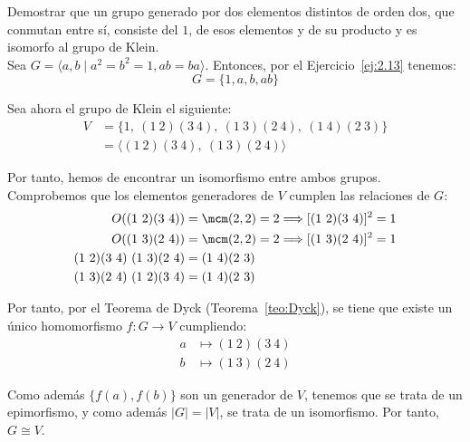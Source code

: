 \begin{ejercicio}\label{ej:2.32}
    Demostrar que un grupo generado por dos elementos distintos de orden dos, que conmutan entre sí, consiste del $1$, de esos elementos y de su producto y es isomorfo al grupo de Klein.\\

    Sea $G=\langle a,b\mid a^2=b^2=1, ab=ba\rangle$. Entonces, por el Ejercicio~\ref{ej:2.13} tenemos:
    \begin{equation*}
        G=\{1,a,b,ab\}
    \end{equation*}

    Sea ahora el grupo de Klein el siguiente:
    \begin{align*}
        V&=\{1,\ (1\ 2)(3\ 4),\ (1\ 3)(2\ 4),\ (1\ 4)(2\ 3)\}\\
        &= \langle (1\ 2)(3\ 4),\ (1\ 3)(2\ 4) \rangle
    \end{align*}

    Por tanto, hemos de encontrar un isomorfismo entre ambos grupos. Comprobemos que los elementos generadores de $V$ cumplen las relaciones de $G$:
    \begin{align*}
        O((1\ 2)(3\ 4))&= \mcm(2,2)=2\Longrightarrow [(1\ 2)(3\ 4)]^2=1\\
        O((1\ 3)(2\ 4))&= \mcm(2,2)=2\Longrightarrow [(1\ 3)(2\ 4)]^2=1\\
        (1\ 2)(3\ 4)\ (1\ 3)(2\ 4)&=(1\ 4)(2\ 3)\\
        (1\ 3)(2\ 4)\ (1\ 2)(3\ 4)&=(1\ 4)(2\ 3)
    \end{align*}

    Por tanto, por el Teorema de Dyck (Teorema~\ref{teo:Dyck}), se tiene que existe un único homomorfismo $f:G\to V$ cumpliendo:
    \begin{align*}
        a &\mapsto (1\ 2)(3\ 4)\\
        b &\mapsto (1\ 3)(2\ 4)
    \end{align*}

    Como además $\{f(a),f(b)\}$ son un generador de $V$, tenemos que se trata de un epimorfismo, y como además $|G|=|V|$, se trata de un isomorfismo. Por tanto, $G\cong V$.
\end{ejercicio}

